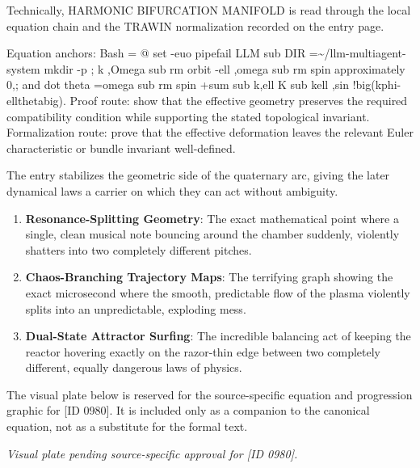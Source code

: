 Technically, HARMONIC BIFURCATION MANIFOLD is read through the local equation chain and the TRAWIN normalization recorded on the entry page.

Equation anchors: Bash = @ set -euo pipefail LLM sub DIR =\textasciitilde{}/llm-multiagent-system mkdir -p ; k ,Omega sub rm orbit -ell ,omega sub rm spin approximately 0,; and dot theta =omega sub rm spin +sum sub k,ell K sub kell ,sin !big(kphi-ellthetabig). Proof route: show that the effective geometry preserves the required compatibility condition while supporting the stated topological invariant. Formalization route: prove that the effective deformation leaves the relevant Euler characteristic or bundle invariant well-defined.

The entry stabilizes the geometric side of the quaternary arc, giving the later dynamical laws a carrier on which they can act without ambiguity.
\endgroup

\begin{enumerate}[leftmargin=1.6em,itemsep=6pt,topsep=4pt]
\item \textbf{Resonance-Splitting Geometry}: The exact mathematical point where a single, clean musical note bouncing around the chamber suddenly, violently shatters into two completely different pitches.
\item \textbf{Chaos-Branching Trajectory Maps}: The terrifying graph showing the exact microsecond where the smooth, predictable flow of the plasma violently splits into an unpredictable, exploding mess.
\item \textbf{Dual-State Attractor Surfing}: The incredible balancing act of keeping the reactor hovering exactly on the razor-thin edge between two completely different, equally dangerous laws of physics.
\end{enumerate}

\begingroup\footnotesize\sloppy
The visual plate below is reserved for the source-specific equation and progression graphic for [ID 0980]. It is included only as a companion to the canonical equation, not as a substitute for the formal text.
\par\endgroup
\begingroup\footnotesize\itshape
Visual plate pending source-specific approval for [ID 0980].
\par\endgroup

